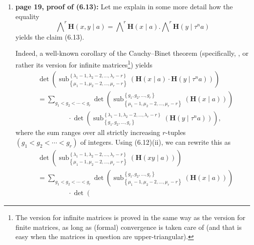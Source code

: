 \documentclass[numbers=enddot,12pt,final,onecolumn,notitlepage]{scrartcl}%
\theoremstyle{definition}
\let\sumnonlimits\sum
\renewcommand{\sum}{\sumnonlimits\limits}
\begin{document}
\begin{enumerate}
\item \textbf{page 19, proof of (6.13):} Let me explain in some more detail
how the equality
\[
\bigwedge\nolimits^{r}\mathbf{H}\left(  x,y\mid a\right)  =\bigwedge
\nolimits^{r}\mathbf{H}\left(  x\mid a\right)  .\bigwedge\nolimits^{r}%
\mathbf{H}\left(  y\mid\tau^{n}a\right)
\]
yields the claim (6.13).

Indeed, a well-known corollary of the Cauchy--Binet theorem (specifically,
\cite[Corollary 7.182]{detnotes}, or rather its version for infinite
matrices\footnote{The version for infinite matrices is proved in the same way
as the version for finite matrices, as long as (formal) convergence is taken
care of (and that is easy when the matrices in question are
upper-triangular).}) yields%
\begin{align*}
&  \det\left(  \operatorname*{sub}\nolimits_{\left\{  \mu_{1}-1,\mu
_{2}-2,\ldots,\mu_{r}-r\right\}  }^{\left\{  \lambda_{1}-1,\lambda
_{2}-2,\ldots,\lambda_{r}-r\right\}  }\left(  \mathbf{H}\left(  x\mid
a\right)  \cdot\mathbf{H}\left(  y\mid\tau^{n}a\right)  \right)  \right) \\
&  =\sum_{g_{1}<g_{2}<\cdots<g_{r}}\det\left(  \operatorname*{sub}%
\nolimits_{\left\{  \mu_{1}-1,\mu_{2}-2,\ldots,\mu_{r}-r\right\}  }^{\left\{
g_{1},g_{2},\ldots,g_{r}\right\}  }\left(  \mathbf{H}\left(  x\mid a\right)
\right)  \right) \\
&  \ \ \ \ \ \ \ \ \ \ \ \ \ \ \ \ \ \ \ \ \cdot\det\left(
\operatorname*{sub}\nolimits_{\left\{  g_{1},g_{2},\ldots,g_{r}\right\}
}^{\left\{  \lambda_{1}-1,\lambda_{2}-2,\ldots,\lambda_{r}-r\right\}  }\left(
\mathbf{H}\left(  y\mid\tau^{n}a\right)  \right)  \right)  ,
\end{align*}
where the sum ranges over all strictly increasing $r$-tuples $\left(
g_{1}<g_{2}<\cdots<g_{r}\right)  $ of integers. Using (6.12)(ii), we can
rewrite this as%
\begin{align}
&  \det\left(  \operatorname*{sub}\nolimits_{\left\{  \mu_{1}-1,\mu
_{2}-2,\ldots,\mu_{r}-r\right\}  }^{\left\{  \lambda_{1}-1,\lambda
_{2}-2,\ldots,\lambda_{r}-r\right\}  }\left(  \mathbf{H}\left(  xy\mid
a\right)  \right)  \right) \nonumber\\
&  =\sum_{g_{1}<g_{2}<\cdots<g_{r}}\det\left(  \operatorname*{sub}%
\nolimits_{\left\{  \mu_{1}-1,\mu_{2}-2,\ldots,\mu_{r}-r\right\}  }^{\left\{
g_{1},g_{2},\ldots,g_{r}\right\}  }\left(  \mathbf{H}\left(  x\mid a\right)
\right)  \right) \nonumber\\
&  \ \ \ \ \ \ \ \ \ \ \ \ \ \ \ \ \ \ \ \ \cdot\det\left(

\end{align}
\end{enumerate}
\end{document}
